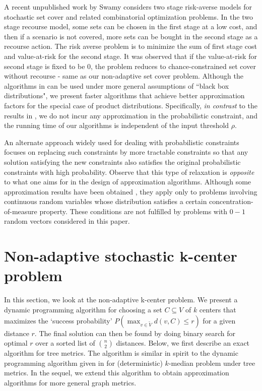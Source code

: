 \documentclass[11pt,onecolumn]{article}
\begin{document}
A recent unpublished work by Swamy \cite{swamy-risk-averse} considers two stage risk-averse models for stochastic set cover and related combinatorial optimization problems. In the two stage recourse model, some sets can be chosen in the first stage at a low cost, and then if a scenario is not covered, more sets can be bought in the second stage as a recourse action. The risk averse problem is to minimize the sum of first stage cost and value-at-risk for the second stage. It was observed that if the value-at-risk for second stage is fixed to be $0$, the problem reduces to chance-constrained set cover without recourse - same as our non-adaptive set cover problem. Although the algorithms in \cite{swamy-risk-averse} can be used under more general assumptions of ``black box distributions", we present faster algorithms that achieve better approximation factors for the special case of product distributions. Specifically, {\it in contrast} to the results in \cite{swamy-risk-averse}, we do not incur any approximation in the probabilistic constraint, and the running time of our algorithms is independent of the input threshold $\rho$.  

An alternate approach widely used for dealing with probabilistic constraints focuses on replacing such constraints by more tractable constraints \cite{calafiore-chance06, neimro-chance06, iyengar-chance07} so that any solution satisfying the new constraints also satisfies the original probabilistic constraints with high probability. Observe that this type of relaxation is {\it opposite} to what one aims for in the design of approximation algorithms. 
Although some approximation results have been obtained \cite{calafiore-chance06, neimro-chance06, iyengar-chance07}, they apply only to problems involving continuous random variables whose distribution satisfies a certain concentration-of-measure property. These conditions are not fulfilled by problems with $0-1$ random vectors considered in this paper.

\section{Non-adaptive stochastic k-center problem}
In this section, we look at the non-adaptive k-center problem. We present a dynamic programming algorithm for choosing a set $C\subseteq V$ of $k$ centers that maximizes the `success probability' $P(\max_{v\in \tilde{V}} d(v,C) \le r)$ for a given distance $r$. The final solution can then be found by doing binary search for optimal $r$ over a sorted list of ${n \choose 2}$ distances. 
Below, we first describe an exact algorithm for tree metrics. The algorithm is similar in spirit to the dynamic programming algorithm given in \cite{p-median} for (deterministic) $k$-median problem under tree metrics. 
In the sequel, we extend this algorithm to obtain approximation algorithms for more general graph metrics.
\end{document}

